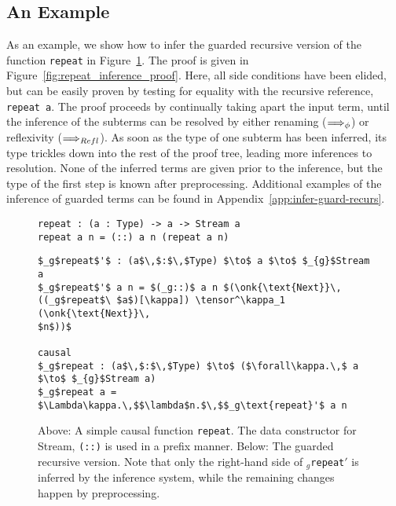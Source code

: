 \subsection{An Example}
As an example, we show how to infer the guarded recursive version of the
function \texttt{repeat} in Figure~\ref{fig:repeat_proof_example_program}. The
proof is given in Figure~\ref{fig:repeat_inference_proof}. Here, all side
conditions have been elided, but can be easily proven by testing for equality
with the recursive reference, \texttt{repeat a}. The proof proceeds by
continually taking apart the input term, until the inference of the subterms can
be resolved by either renaming ($\Longrightarrow_\phi$) or reflexivity
($\Longrightarrow_{Refl}$). As soon as the type of one subterm has been inferred, its
type trickles down into the rest of the proof tree, leading more inferences to
resolution. None of the inferred terms are given prior to the inference, but the
type of the first step is known after preprocessing. Additional examples of the
inference of guarded terms can be found in Appendix~\ref{app:infer-guard-recurs}.


\begin{figure}[h]
\begin{lstlisting}[mathescape, title=\ttBlock]
repeat : (a : Type) -> a -> Stream a
repeat a n = (::) a n (repeat a n)
\end{lstlisting}
\begin{lstlisting}[mathescape, title=\ttBlock]
$_g$repeat$'$ : (a$\,$:$\,$Type) $\to$ a $\to$ $_{g}$Stream a
$_g$repeat$'$ a n = $(_g::)$ a n $(\onk{\text{Next}}\,((_g$repeat$\ $a$)[\kappa]) \tensor^\kappa_1 (\onk{\text{Next}}\,
$n$))$

causal 
$_g$repeat : (a$\,$:$\,$Type) $\to$ ($\forall\kappa.\,$ a $\to$ $_{g}$Stream a)
$_g$repeat a = $\Lambda\kappa.\,$$\lambda$n.$\,$$_g\text{repeat}'$ a n
\end{lstlisting}
  \caption{Above: A simple causal function \texttt{repeat}. The data constructor for
    Stream, \texttt{(::)} is used in a prefix manner. Below: The guarded
    recursive version. Note that only the right-hand side of
    \texttt{$_g$repeat$'$} is inferred by the inference system, while the
    remaining changes happen by preprocessing.}
\label{fig:repeat_proof_example_program}
\end{figure}


